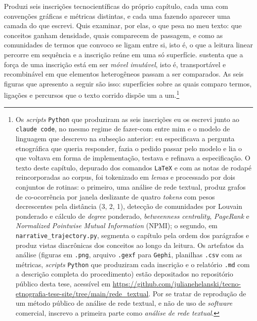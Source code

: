 Produzi seis inscrições tecnocientíficas do próprio capítulo, cada uma com convenções gráficas e métricas distintas, e cada uma fazendo aparecer uma camada do que escrevi. Quis examinar, por elas, o que pesa no meu texto: que conceitos ganham densidade, quais comparecem de passagem, e como as comunidades de termos que convoco se ligam entre si, isto é, o que a leitura linear percorre em sequência e a inscrição reúne em uma só superfície. \textcite{Latour1986Visualization} sustenta que a força de uma inscrição está em ser \textit{móvel imutável}, isto é, transportável e recombinável em que elementos heterogêneos passam a ser comparados. As seis figuras que apresento a seguir são isso: superfícies sobre as quais comparo termos, ligações e percursos que o texto corrido dispõe um a um.\footnote{Os \textit{scripts} \texttt{Python} que produziram as seis inscrições eu os escrevi junto ao \texttt{claude code}, no mesmo regime de fazer-com entre mim e o modelo de linguagem que descrevo na subseção anterior: eu especificava a pergunta etnográfica que queria responder, fazia o pedido passar pelo modelo e lia o que voltava em forma de implementação, testava e refinava a especificação. O texto deste capítulo, depurado dos comandos \texttt{LaTeX} e com as notas de rodapé reincorporadas ao corpus, foi tokenizado em \textit{lemas} e processado por dois conjuntos de rotinas: o primeiro, uma análise de rede textual, produz grafos de co-ocorrência por janela deslizante de quatro \textit{tokens} com pesos decrescentes pela distância (3, 2, 1), detecção de comunidades por Louvain ponderado e cálculo de \textit{degree} ponderado, \textit{betweenness centrality}, \textit{PageRank} e \textit{Normalized Pointwise Mutual Information} (NPMI); o segundo, em \texttt{narrative\_trajectory.py}, segmenta o capítulo pela ordem dos parágrafos e produz vistas diacrônicas dos conceitos ao longo da leitura. Os artefatos da análise (figuras em \texttt{.png}, arquivo \texttt{.gexf} para \texttt{Gephi}, planilhas \texttt{.csv} com as métricas, \textit{scripts} \texttt{Python} que produziram cada inscrição e o relatório \texttt{.md} com a descrição completa do procedimento) estão depositados no repositório público desta tese, acessível em \url{https://github.com/julianehelanski/tecno-etnografia-tese-site/tree/main/rede_textual}. Por se tratar de reprodução de um método público de análise de rede textual, e não de uso de \textit{software} comercial, inscrevo a primeira parte como \textit{análise de rede textual}.}

